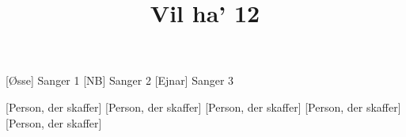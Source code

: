 \documentclass[a4paper,11pt]{article}
\title{Vil ha' 12}
\begin{document}
\maketitle

\begin{roles}
[Øsse] Sanger 1
[NB] Sanger 2
[Ejnar] Sanger 3
\end{roles}

\begin{props}
[Person, der skaffer]
[Person, der skaffer]
[Person, der skaffer]
[Person, der skaffer]
[Person, der skaffer]
\end{props}
\end{document}
